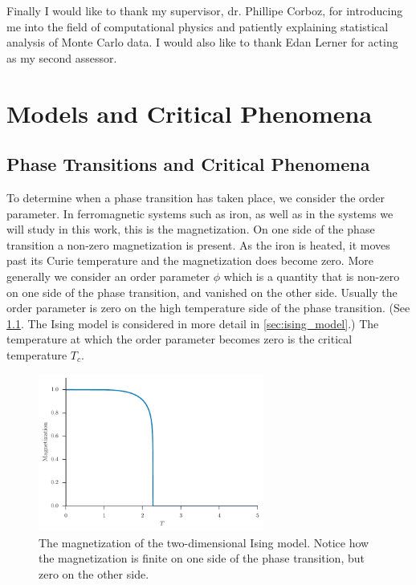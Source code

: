 \documentclass[11pt, a4paper]{report} %
\begin{document}
Finally I would like to thank my supervisor, dr. Phillipe Corboz, for introducing me into the field of computational physics and patiently explaining statistical analysis of Monte Carlo data.
I would also like to thank Edan Lerner for acting as my second assessor.

\chapter{Models and Critical Phenomena}

\section{Phase Transitions and Critical Phenomena}
To determine when a phase transition has taken place, we consider the order parameter.
In ferromagnetic systems such as iron, as well as in the systems we will study in this work, this is the magnetization.
On one side of the phase transition a non-zero magnetization is present.
As the iron is heated, it moves past its Curie temperature and the magnetization does become zero.
More generally we consider an order parameter \(\phi\) which is a quantity that is non-zero on one side of the phase transition, and vanished on the other side. Usually the order parameter is zero on the high temperature side of the phase transition. (See \cref{fig:ising_magnetization}. The Ising model is considered in more detail in \cref{sec:ising_model}.)
The temperature at which the order parameter becomes zero is the critical temperature \(T_c\).
\begin{figure}[h]
	\centering
	\includegraphics[width=0.66\textwidth]{ising_magnetization}
	\caption{The magnetization of the two-dimensional Ising model. Notice how the magnetization is finite on one side of the phase transition, but zero on the other side.}
	\label{fig:ising_magnetization}
\end{figure}
\end{document}
